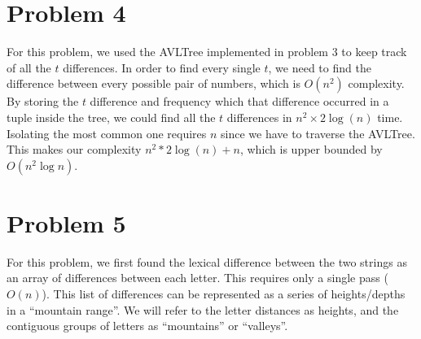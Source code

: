 \documentclass[letterpaper, 12pt]{math}
\begin{document}
\section*{Problem 4}
For this problem, we used the AVLTree implemented in problem 3 to keep track
of all the \( t \) differences. In order to find every single \( t \), we need
to find the difference between every possible pair of numbers, which is
\( O(n^2) \) complexity. By storing the \( t \) difference and frequency which
that difference occurred in a tuple inside the tree, we could find all the
\( t \) differences in \( n^2\times2\log(n) \) time. Isolating the most common
one requires \( n \) since we have to traverse the AVLTree. This makes our
complexity \( n^2*2\log(n)+n \), which is upper bounded by \( O(n^2\log n) \).

\section*{Problem 5}
For this problem, we first found the lexical difference between the two strings
as an array of differences between each letter. This requires only a single
pass (\( O(n) \)). This list of differences can be represented as a series of
heights/depths in a ``mountain range''. We will refer to the letter distances
as heights, and the contiguous groups of letters as ``mountains'' or
``valleys''.
\end{document}
